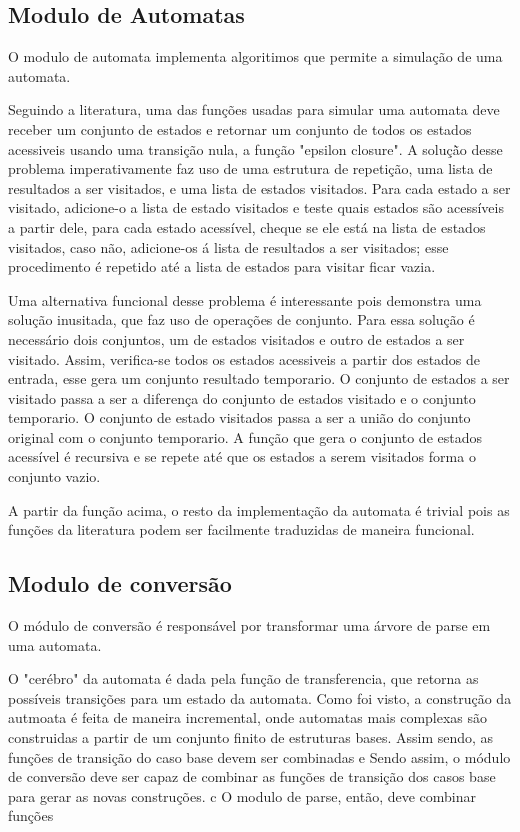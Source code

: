 \subsection{Modulo de Automatas}
O modulo de automata implementa algoritimos que permite a simulação de uma automata.

Seguindo a literatura, uma das funções usadas para simular uma automata deve receber um conjunto de estados e retornar um conjunto de todos os estados acessiveis usando uma transição nula, a função "epsilon closure".
A soluçã̀o desse problema imperativamente faz uso de uma estrutura de repetição, uma lista de resultados a ser visitados, e uma lista de estados visitados.
Para cada estado a ser visitado, adicione-o a lista de estado visitados e teste quais estados são acessíveis a partir dele, para cada estado acessível, cheque se ele está na lista de estados visitados, caso não, adicione-os á lista de resultados a ser visitados; esse procedimento é repetido até a lista de estados para visitar ficar vazia.

Uma alternativa funcional desse problema é interessante pois demonstra uma solução inusitada, que faz uso de operações de conjunto.
Para essa solução é necessário dois conjuntos, um de estados visitados e outro de estados a ser visitado.
Assim, verifica-se todos os estados acessiveis a partir dos estados de entrada, esse gera um conjunto resultado temporario.
O conjunto de estados a ser visitado passa a ser a diferença do conjunto de estados visitado e o conjunto temporario.
O conjunto de estado visitados passa a ser a união do conjunto original com o conjunto temporario.
A função que gera o conjunto de estados acessível é recursiva e se repete até que os estados a serem visitados forma o conjunto vazio.

A partir da função acima, o resto da implementação da automata é trivial pois as funções da literatura podem ser facilmente traduzidas de maneira funcional.

\subsection{Modulo de conversão}
O módulo de conversão é responsável por transformar uma árvore de parse em uma automata.

O "cerébro" da automata é dada pela função de transferencia, que retorna as possíveis transições para um estado da automata.
Como foi visto, a construção da autmoata é feita de maneira incremental, onde automatas mais complexas são construidas a partir de um conjunto finito de estruturas bases.
Assim sendo, as funções de transição do caso base devem ser combinadas e 
Sendo assim, o módulo de conversão deve ser capaz de combinar as funções de transição dos casos base para gerar as novas construções.
c
O modulo de parse, então, deve combinar funções




